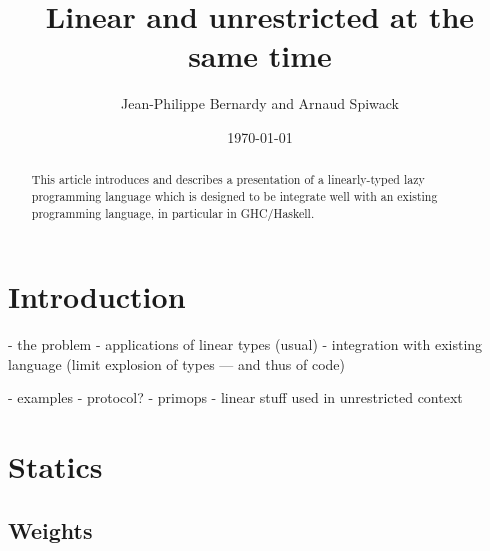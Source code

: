 \documentclass[11pt]{article}
\author{Jean-Philippe Bernardy and Arnaud Spiwack}
\date{\today}
\title{Linear and unrestricted at the same time}
\begin{document}
\maketitle
\begin{abstract}
  \noindent This article introduces and describes a presentation of a
  linearly-typed lazy programming language which is designed to be
  integrate well with an existing programming language, in particular
  in GHC/Haskell.
\end{abstract}

\setcounter{tocdepth}{1}
\tableofcontents

\section{Introduction}

- the problem
  - applications of linear types (usual)
  - integration with existing language (limit explosion of types --- and thus of code)

- examples
  - protocol?
  - primops
  - linear stuff used in unrestricted context

\section{Statics}
\label{sec:orgheadline8}
\subsection{Weights}
\label{sec:orgheadline1}
\end{document}
